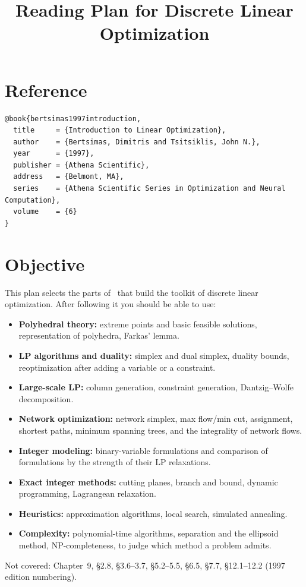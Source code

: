\documentclass[11pt,a4paper]{article}
\title{Reading Plan for Discrete Linear Optimization}
\author{}
\date{}
\begin{document}
\maketitle
\vspace{-1.8cm}

\section*{Reference}
{\small
\begin{verbatim}
@book{bertsimas1997introduction,
  title     = {Introduction to Linear Optimization},
  author    = {Bertsimas, Dimitris and Tsitsiklis, John N.},
  year      = {1997},
  publisher = {Athena Scientific},
  address   = {Belmont, MA},
  series    = {Athena Scientific Series in Optimization and Neural Computation},
  volume    = {6}
}
\end{verbatim}}

\section*{Objective}
This plan selects the parts of~\cite{bertsimas1997introduction} that build
the toolkit of discrete linear optimization. After following it you should
be able to use:
\begin{itemize}[nosep]
  \item \textbf{Polyhedral theory:} extreme points and basic feasible
        solutions, representation of polyhedra, Farkas' lemma.
  \item \textbf{LP algorithms and duality:} simplex and dual simplex, duality
        bounds, reoptimization after adding a variable or a constraint.
  \item \textbf{Large-scale LP:} column generation, constraint generation,
        Dantzig--Wolfe decomposition.
  \item \textbf{Network optimization:} network simplex, max flow/min cut,
        assignment, shortest paths, minimum spanning trees, and the
        integrality of network flows.
  \item \textbf{Integer modeling:} binary-variable formulations and comparison
        of formulations by the strength of their LP relaxations.
  \item \textbf{Exact integer methods:} cutting planes, branch and bound,
        dynamic programming, Lagrangean relaxation.
  \item \textbf{Heuristics:} approximation algorithms, local search,
        simulated annealing.
  \item \textbf{Complexity:} polynomial-time algorithms, separation and the
        ellipsoid method, NP-completeness, to judge which method a problem
        admits.
\end{itemize}
Not covered: Chapter~9, \S2.8, \S3.6--3.7, \S5.2--5.5, \S6.5, \S7.7,
\S12.1--12.2 (1997 edition numbering).
\end{document}
